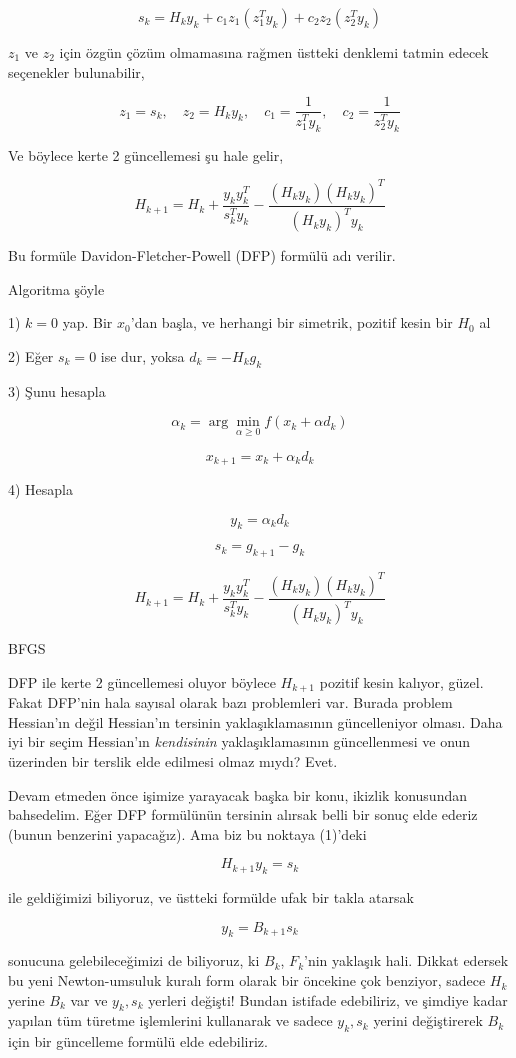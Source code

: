\documentclass[12pt,fleqn]{article}\usepackage{../../common}
\begin{document}
$$
s_k = H_k y_k + c_1 z_1 (z_1^Ty_k) + c_2z_2 (z_2^Ty_k)
$$

$z_1$ ve $z_2$ için özgün çözüm olmamasına rağmen üstteki denklemi tatmin
edecek seçenekler bulunabilir,

$$
z_1 = s_k, \quad 
z_2 = H_k y_k, \quad
c_1 = \frac{1}{z_1^Ty_k}, \quad
c_2 = \frac{1}{z_2^Ty_k}
$$

Ve böylece kerte 2 güncellemesi şu hale gelir, 

$$
H_{k+1} = H_k + \frac{y_ky_k^T}{s_k^Ty_k} - \frac{(H_k y_k)(H_k y_k)^T}{(H_ky_k)^Ty_k}
$$

Bu formüle Davidon-Fletcher-Powell (DFP) formülü adı verilir. 

Algoritma şöyle

1) $k=0$ yap. Bir $x_0$'dan başla, ve herhangi bir simetrik, pozitif kesin
bir $H_0$ al

2) Eğer $s_k = 0$ ise dur, yoksa $d_k = -H_k g_k$

3) Şunu hesapla

$$
\alpha_k = \arg\min_{\alpha \ge 0} f(x_k + \alpha d_k)
$$

$$
x_{k+1} = x_k + \alpha_k d_k
$$

4) Hesapla

$$
y_k = \alpha_k d_k
$$

$$
s_k = g_{k+1} - g_k
$$

$$
H_{k+1} = H_k + \frac{y_ky_k^T}{s_k^Ty_k} - \frac{(H_k y_k)(H_k y_k)^T}{(H_ky_k)^Ty_k}
$$

BFGS

DFP ile kerte 2 güncellemesi oluyor böylece $H_{k+1}$ pozitif kesin
kalıyor, güzel. Fakat DFP'nin hala sayısal olarak bazı problemleri
var. Burada problem Hessian'ın değil Hessian'ın tersinin yaklaşıklamasının
güncelleniyor olması. Daha iyi bir seçim Hessian'ın {\em kendisinin}
yaklaşıklamasının güncellenmesi ve onun üzerinden bir terslik elde
edilmesi olmaz mıydı? Evet.

Devam etmeden önce işimize yarayacak başka bir konu, ikizlik konusundan
bahsedelim. Eğer DFP formülünün tersinin alırsak belli bir sonuç elde
ederiz (bunun benzerini yapacağız). Ama biz bu noktaya (1)'deki

$$
H_{k+1} y_k = s_k
$$

ile geldiğimizi biliyoruz, ve üstteki formülde ufak bir takla atarsak

$$
y_k = B_{k+1} s_k
$$

sonucuna gelebileceğimizi de biliyoruz, ki $B_k$, $F_k$'nin yaklaşık
hali. Dikkat edersek bu yeni Newton-umsuluk kuralı form olarak bir öncekine
çok benziyor, sadece $H_k$ yerine $B_k$ var ve $y_k,s_k$ yerleri değişti!
Bundan istifade edebiliriz, ve şimdiye kadar yapılan tüm türetme
işlemlerini kullanarak ve sadece $y_k,s_k$ yerini değiştirerek $B_k$ için
bir güncelleme formülü elde edebiliriz.
\end{document}
